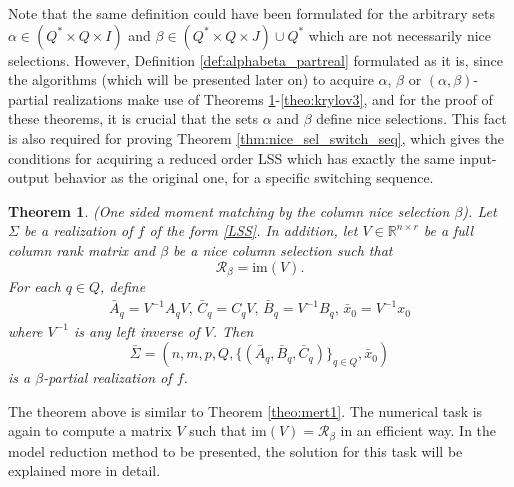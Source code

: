 \documentclass[journal]{IEEEtran}
\newcommand{\IM}{\mathrm{im}}
\newtheorem{Theorem}{Theorem}
\begin{document}
Note that the same definition could have been formulated for the arbitrary sets $\alpha \in (Q^* \times Q \times I)$ and $\beta \in (Q^* \times Q \times J) \cup Q^*$ which are not necessarily nice selections. However, Definition \ref{def:alphabeta_partreal} formulated as it is, since the algorithms (which will be presented later on) to acquire $\alpha$, $\beta$ or $(\alpha,\beta)$-partial realizations make use of Theorems \ref{theo:krylov1}-\ref{theo:krylov3}, and for the proof of these theorems, it is crucial that the sets $\alpha$ and $\beta$ define nice selections. This fact is also required for proving Theorem \ref{thm:nice_sel_switch_seq}, which gives the conditions for acquiring a reduced order LSS which has exactly the same input-output behavior as the original one, for a specific switching sequence.

\begin{Theorem} \label{theo:krylov1}
	\emph{(One sided moment matching by the column nice selection $\beta$).}
	Let $\Sigma$ be a realization of $f$ of the form \eqref{LSS}. In addition, let $V \in \mathbb{R}^{n \times r}$ be a full column rank matrix and $\beta$ be a nice column selection such that
	\[
	\mathscr{R}_{\beta} = \IM (V).
	\]
	For each $q \in Q$, define
	\[
	\begin{split}
	\bar{A}_q=V^{-1}A_qV \mbox{, } \bar{C}_q=C_qV \mbox{, } \bar{B}_q=V^{-1}B_q \mbox{, } \bar{x}_0=V^{-1}x_0
	\end{split}
	\]
	where $V^{-1}$ is any left inverse of $V$.
	Then
	\[ \bar{\Sigma}=(n,m,p,Q,\{(\bar{A}_q,\bar{B}_q,\bar{C}_q)\}_{q \in Q},\bar{x}_0) \]
	is a $\beta$-partial realization of $f$.
\end{Theorem}

The theorem above is similar to Theorem \ref{theo:mert1}. The numerical task is again to compute a matrix $V$ such that $\IM (V)=\mathscr{R}_{\beta}$ in an efficient way. In the model reduction method to be presented, the solution for this task will be explained more in detail.
\end{document}
